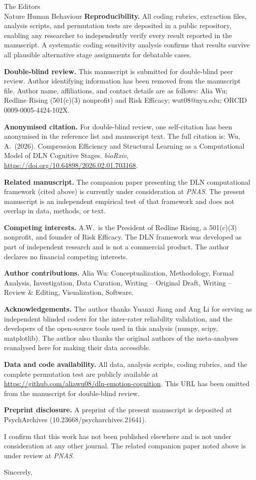 \documentclass[11pt]{letter}
\begin{document}
\begin{letter}{The Editors\\Nature Human Behaviour}
\textbf{Reproducibility.} All coding rubrics, extraction files,
analysis scripts, and permutation tests are deposited in a public
repository, enabling any researcher to independently verify every
result reported in the manuscript. A systematic coding sensitivity
analysis confirms that results survive all plausible alternative
stage assignments for debatable cases.

\textbf{Double-blind review.} This manuscript is submitted for
double-blind peer review. Author identifying information has been
removed from the manuscript file. Author name, affiliations, and
contact details are as follows: Alia Wu; Redline Rising (501(c)(3)
nonprofit) and Risk Efficacy; wut08@nyu.edu; ORCID
0009-0005-4424-102X.

\textbf{Anonymised citation.} For double-blind review, one
self-citation has been anonymised in the reference list and
manuscript text. The full citation is: Wu, A.\ (2026). Compression
Efficiency and Structural Learning as a Computational Model of DLN
Cognitive Stages. \textit{bioRxiv},
\url{https://doi.org/10.64898/2026.02.01.703168}.

\textbf{Related manuscript.} The companion paper presenting the DLN
computational framework (cited above) is currently under
consideration at \textit{PNAS}. The present manuscript is an
independent empirical test of that framework and does not overlap in
data, methods, or text.

\textbf{Competing interests.} A.W.\ is the President of Redline
Rising, a 501(c)(3) nonprofit, and founder of Risk Efficacy. The DLN
framework was developed as part of independent research and is not a
commercial product. The author declares no financial competing
interests.

\textbf{Author contributions.} Alia Wu: Conceptualization,
Methodology, Formal Analysis, Investigation, Data Curation,
Writing -- Original Draft, Writing -- Review \& Editing,
Visualization, Software.

\textbf{Acknowledgements.} The author thanks Yuanxi Jiang and Ang Li
for serving as independent blinded coders for the inter-rater
reliability validation, and the developers of the open-source tools
used in this analysis (numpy, scipy, matplotlib). The author also
thanks the original authors of the meta-analyses reanalysed here for
making their data accessible.

\textbf{Data and code availability.} All data, analysis scripts,
coding rubrics, and the complete permutation test are publicly
available at \url{https://github.com/aliawu08/dln-emotion-cognition}.
This URL has been omitted from the manuscript for double-blind review.

\textbf{Preprint disclosure.} A preprint of the present manuscript
is deposited at PsychArchives (10.23668/psycharchives.21641).

I confirm that this work has not been published elsewhere and is
not under consideration at any other journal. The related companion
paper noted above is under review at \textit{PNAS}.

\closing{Sincerely,}

\end{letter}
\end{document}
